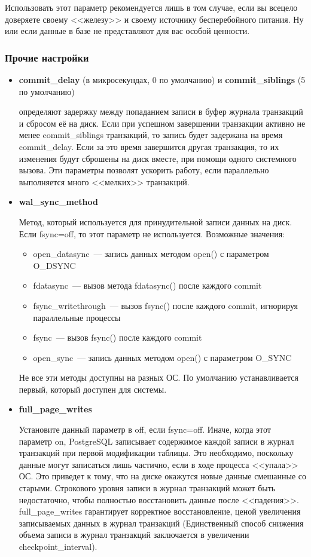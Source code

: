 Использовать этот параметр рекомендуется лишь в том случае, если вы всецело доверяете своему <<железу>> и своему источнику
бесперебойного питания. Ну или если данные в базе не представляют для вас особой ценности.

\subsubsection{Прочие настройки}
\begin{itemize}
\item
\textbf{commit\_delay} (в микросекундах, 0 по умолчанию) и \textbf{commit\_sib\-lings} (5 по умолчанию)

определяют задержку между попаданием записи в буфер журнала транзакций и сбросом её на диск.
Если при успешном завершении транзакции активно не менее commit\_siblings транзакций, то запись будет задержана на время
commit\_delay. Если за это время завершится другая транзакция, то их изменения будут сброшены на диск вместе, при помощи
одного системного вызова. Эти параметры позволят ускорить работу, если параллельно выполняется много <<мелких>> транзакций.

\item \textbf{wal\_sync\_method}

Метод, который используется для принудительной записи данных на диск.
Если fsync=off, то этот параметр не используется.
Возможные значения:
\begin{itemize}
\item open\_datasync~--- запись данных методом open() с параметром O\_DSYNC
\item fdatasync~--- вызов метода fdatasync() после каждого commit
\item fsync\_writethrough~--- вызов fsync() после каждого commit, игнорируя параллельные процессы
\item fsync~--- вызов fsync() после каждого commit
\item open\_sync~--- запись данных методом open() с параметром O\_SYNC
\end{itemize}

Не все эти методы доступны на разных ОС. По умолчанию устанавливается первый, который доступен для системы.

\item \textbf{full\_page\_writes}

Установите данный параметр в off, если fsync=off. Иначе, когда этот параметр on, PostgreSQL записывает содержимое
каждой записи в журнал транзакций при первой модификации таблицы. Это необходимо, поскольку
данные могут записаться лишь частично, если в ходе процесса <<упала>> ОС. Это приведет к тому, что на диске окажутся
новые данные смешанные со старыми. Строкового уровня записи в журнал транзакций может быть недостаточно, чтобы полностью
восстановить данные после <<падения>>. full\_page\_writes гарантирует корректное восстановление, ценой увеличения записываемых
данных в журнал транзакций (Единственный способ снижения объема записи в журнал транзакций заключается в
увеличении checkpoint\_interval).


\end{itemize}
